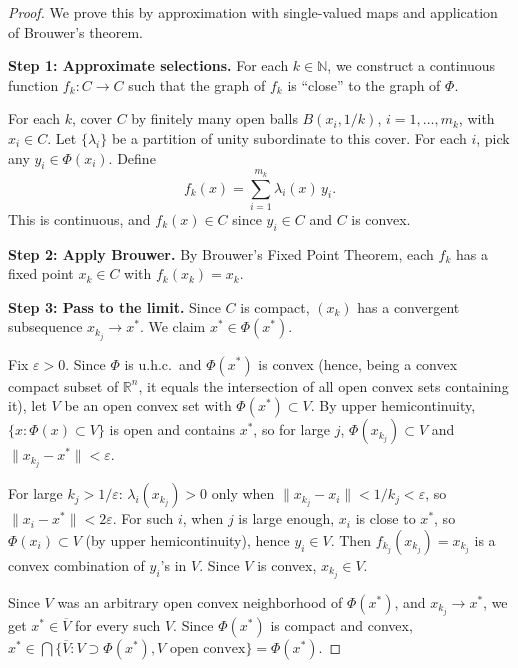 \documentclass[11pt,a4paper]{article}
\theoremstyle{definition}
\theoremstyle{plain}
\theoremstyle{remark}
\newcommand{\R}{\mathbb{R}}
\newcommand{\N}{\mathbb{N}}
\begin{document}
\begin{proof}
We prove this by approximation with single-valued maps and application of
Brouwer's theorem.

\textbf{Step 1: Approximate selections.}
For each $k \in \N$, we construct a continuous function
$f_k \colon C \to C$ such that the graph of $f_k$ is ``close'' to the
graph of $\Phi$.

For each $k$, cover $C$ by finitely many open balls $B(x_i, 1/k)$,
$i = 1, \ldots, m_k$, with $x_i \in C$. Let $\{\lambda_i\}$ be a partition
of unity subordinate to this cover. For each $i$, pick any
$y_i \in \Phi(x_i)$. Define
\[
    f_k(x) = \sum_{i=1}^{m_k} \lambda_i(x) \, y_i.
\]
This is continuous, and $f_k(x) \in C$ since $y_i \in C$ and $C$ is convex.

\textbf{Step 2: Apply Brouwer.}
By Brouwer's Fixed Point Theorem, each $f_k$ has a fixed point
$x_k \in C$ with $f_k(x_k) = x_k$.

\textbf{Step 3: Pass to the limit.}
Since $C$ is compact, $(x_k)$ has a convergent subsequence $x_{k_j} \to x^*$.
We claim $x^* \in \Phi(x^*)$.

Fix $\varepsilon > 0$. Since $\Phi$ is u.h.c.\ and $\Phi(x^*)$ is convex
(hence, being a convex compact subset of $\R^n$, it equals the intersection
of all open convex sets containing it), let $V$ be an open convex set with
$\Phi(x^*) \subset V$. By upper hemicontinuity, $\{x : \Phi(x) \subset V\}$
is open and contains $x^*$, so for large $j$, $\Phi(x_{k_j}) \subset V$
and $\|x_{k_j} - x^*\| < \varepsilon$.

For large $k_j > 1/\varepsilon$: $\lambda_i(x_{k_j}) > 0$ only when
$\|x_{k_j} - x_i\| < 1/k_j < \varepsilon$, so $\|x_i - x^*\| < 2\varepsilon$.
For such $i$, when $j$ is large enough, $x_i$ is close to $x^*$, so
$\Phi(x_i) \subset V$ (by upper hemicontinuity), hence $y_i \in V$.
Then $f_{k_j}(x_{k_j}) = x_{k_j}$ is a convex combination of $y_i$'s in $V$.
Since $V$ is convex, $x_{k_j} \in V$.

Since $V$ was an arbitrary open convex neighborhood of $\Phi(x^*)$, and
$x_{k_j} \to x^*$, we get $x^* \in \overline{V}$ for every such $V$.
Since $\Phi(x^*)$ is compact and convex,
$x^* \in \bigcap \{\overline{V} : V \supset \Phi(x^*), V \text{ open convex}\}
= \Phi(x^*)$.
\end{proof}
\end{document}
